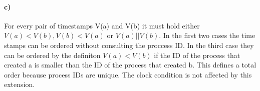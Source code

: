 \documentclass[12pt,a4paper]{article}
\begin{document}
		\paragraph{c)} For every pair of timestamps V(a) and V(b) it must hold either $V(a)<V(b), V(b)<V(a)$ or $V(a)||V(b)$. In the first two cases the time stamps can be ordered without consulting the proccess ID. In the third case they can be ordered by the definiton $V(a)<V(b)$ if the ID of the process that created a is smaller than the ID of the process that created b. This defines a total order because process IDs are unique. The clock condition is not affected by this extension.
\end{document}
